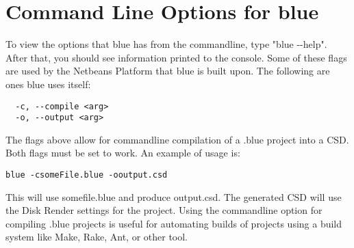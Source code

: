 \section{Command Line Options for blue}\label{commandLine}

To view the options that blue has from the commandline, type "blue
-\/-help". After that, you should see information printed to the
console. Some of these flags are used by the Netbeans Platform that blue
is built upon. The following are ones blue uses itself:

\begin{verbatim}
  -c, --compile <arg>       
  -o, --output <arg>
\end{verbatim}

The flags above allow for commandline compilation of a .blue project
into a CSD. Both flags must be set to work. An example of usage is:

\begin{verbatim}
blue -csomeFile.blue -ooutput.csd
\end{verbatim}

This will use somefile.blue and produce output.csd. The generated CSD
will use the Disk Render settings for the project. Using the commandline
option for compiling .blue projects is useful for automating builds of
projects using a build system like Make, Rake, Ant, or other tool.
